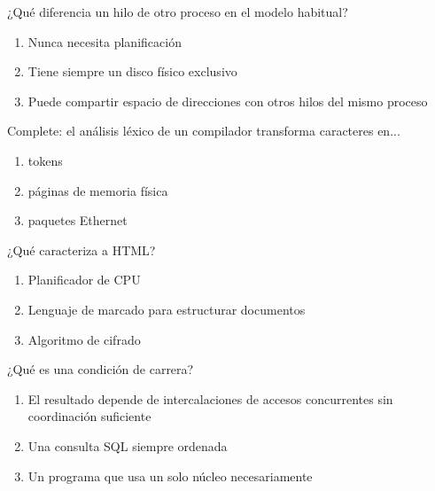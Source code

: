 \noindent\begin{minipage}{\linewidth}\setlength{\parskip}{4pt}\label{q:S-035}
¿Qué diferencia un hilo de otro proceso en el modelo habitual?
\begin{enumerate}[label=\Alph*),nosep]
\item Nunca necesita planificación
\item Tiene siempre un disco físico exclusivo
\item Puede compartir espacio de direcciones con otros hilos del mismo proceso
\end{enumerate}\end{minipage}\par\medskip

\noindent\begin{minipage}{\linewidth}\setlength{\parskip}{4pt}\label{q:S-036}
Complete: el análisis léxico de un compilador transforma caracteres en...
\begin{enumerate}[label=\Alph*),nosep]
\item tokens
\item páginas de memoria física
\item paquetes Ethernet
\end{enumerate}\end{minipage}\par\medskip

\noindent\begin{minipage}{\linewidth}\setlength{\parskip}{4pt}\label{q:S-037}
¿Qué caracteriza a HTML?
\begin{enumerate}[label=\Alph*),nosep]
\item Planificador de CPU
\item Lenguaje de marcado para estructurar documentos
\item Algoritmo de cifrado
\end{enumerate}\end{minipage}\par\medskip

\noindent\begin{minipage}{\linewidth}\setlength{\parskip}{4pt}\label{q:S-038}
¿Qué es una condición de carrera?
\begin{enumerate}[label=\Alph*),nosep]
\item El resultado depende de intercalaciones de accesos concurrentes sin coordinación suficiente
\item Una consulta SQL siempre ordenada
\item Un programa que usa un solo núcleo necesariamente
\end{enumerate}\end{minipage}\par\medskip


